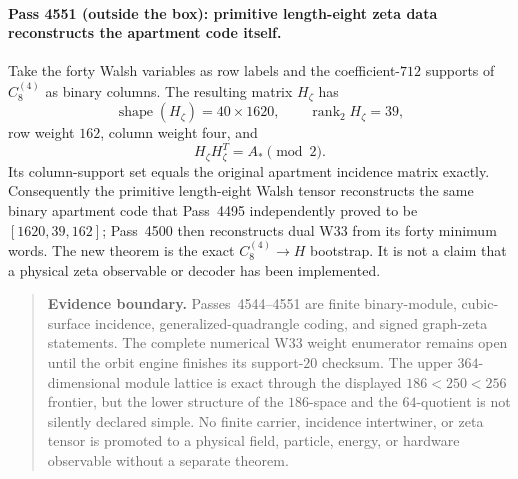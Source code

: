 \paragraph{Pass 4551 (outside the box): primitive length-eight zeta data reconstructs the apartment code itself.}
Take the forty Walsh variables as row labels and the coefficient-$712$ supports
of $C_8^{(4)}$ as binary columns.  The resulting matrix $H_{\zeta}$ has
\[
 \boxed{\operatorname{shape}(H_{\zeta})=40\times1620,\qquad
        \operatorname{rank}_2H_{\zeta}=39,}
\]
row weight $162$, column weight four, and
\[
 \boxed{H_{\zeta}H_{\zeta}^T=A_*\pmod2.}
\]
Its column-support set equals the original apartment incidence matrix exactly.
Consequently the primitive length-eight Walsh tensor reconstructs the same
binary apartment code that Pass~4495 independently proved to be
$[1620,39,162]$; Pass~4500 then reconstructs dual W33 from its forty minimum
words.  The new theorem is the exact $C_8^{(4)}\to H$ bootstrap.  It is not a
claim that a physical zeta observable or decoder has been implemented.

\begin{quote}\small
\textbf{Evidence boundary.}
Passes~4544--4551 are finite binary-module, cubic-surface incidence,
generalized-quadrangle coding, and signed graph-zeta statements.  The complete
numerical W33 weight enumerator remains open until the orbit engine finishes its
support-$20$ checksum.  The upper $364$-dimensional module lattice is exact
through the displayed $186<250<256$ frontier, but the lower structure of the
$186$-space and the $64$-quotient is not silently declared simple.  No finite
carrier, incidence intertwiner, or zeta tensor is promoted to a physical field,
particle, energy, or hardware observable without a separate theorem.
\end{quote}
